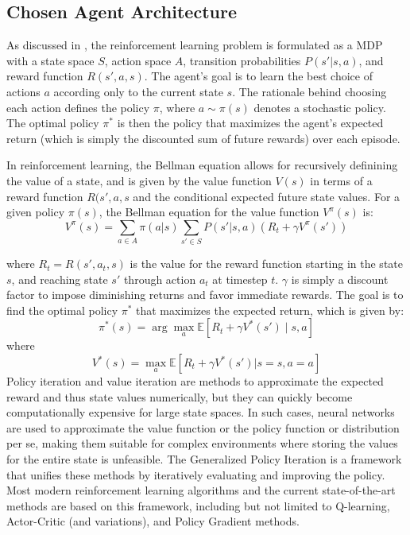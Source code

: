 \documentclass[11pt]{article}
\begin{document}
    \subsection{Chosen Agent Architecture}
    \label{subsec:agent}

    As discussed in , the reinforcement learning problem is formulated as a MDP with a state space \( S \),
    action space \( A \), transition probabilities $P(s'|s, a)$, and reward function $R(s', a, s)$.
    The agent's goal is to learn the best choice of actions $a$ according only to the current state $s$.
    The rationale behind choosing each action defines the policy $\pi$, where $a \sim \pi(s)$ denotes a stochastic policy. 
    The optimal policy $\pi^*$ is then the policy that maximizes the agent’s expected return 
    (which is simply the discounted sum of future rewards) over each episode.

    In reinforcement learning, the Bellman equation allows for recursively definining the value of a state, 
    and is given by the value function $V(s)$ in terms of a reward function $R(s', a, s$ and the conditional expected future state values.
    For a given policy \( \pi(s) \), the Bellman equation for the value function \( V^{\pi}(s) \) is: 
    \begin{equation}
        V^{\pi}(s) = \sum_{a \in A} \pi(a|s) \sum_{s' \in S} P(s'|s, a) \left( R_t + \gamma V^{\pi}(s') \right)
        \label{eq:value}
    \end{equation}

    where \( R_t = R(s', a_t, s)\) is the value for the reward function starting in the state $s$, and reaching state $s'$ through
    action $a_t$ at timestep $t$. \( \gamma \) is simply a discount factor to impose diminishing returns and favor immediate rewards.
    The goal is to find the optimal policy \( \pi^* \) that maximizes the expected return, which is given by:
    \begin{equation}
        \pi^*(s) = \arg\max_a \mathbb{E}[R_t + \gamma V^*(s') \mid s, a]
    \end{equation}
    where
    \begin{equation}
         V^*(s) = \max_a \mathbb{E}[R_t + \gamma V^*(s') | s = s, a = a]      
        \label{eq:value_star}
    \end{equation}
    Policy iteration and value iteration are methods to approximate the expected reward and thus state values numerically,
    but they can quickly become computationally expensive for large state spaces.
    In such cases, neural networks are used to approximate the value function or the policy function or distribution per se, 
    making them suitable for complex environments where storing the values for the entire state is unfeasible.
    The Generalized Policy Iteration is a framework that unifies these methods by iteratively evaluating and improving the policy.
    Most modern reinforcement learning algorithms and the current state-of-the-art methods are based on this framework,
    including but not limited to Q-learning, Actor-Critic (and variations), and Policy Gradient methods.
\end{document}
